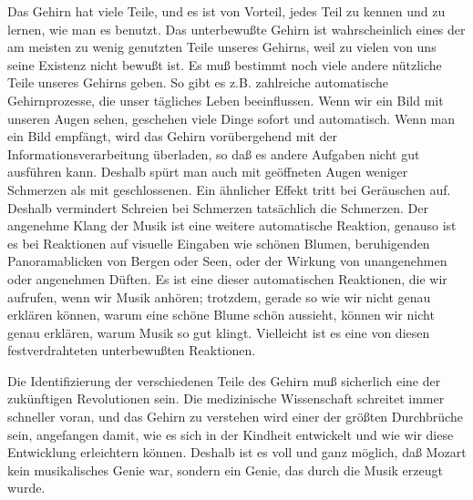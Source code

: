 Das Gehirn hat viele Teile, und es ist von Vorteil, jedes Teil zu kennen und zu lernen, wie man es benutzt.
Das unterbewußte Gehirn ist wahrscheinlich eines der am meisten zu wenig genutzten Teile unseres Gehirns, weil zu vielen von uns seine Existenz nicht bewußt ist.
Es muß bestimmt noch viele andere nützliche Teile unseres Gehirns geben.
So gibt es z.B. zahlreiche automatische Gehirnprozesse, die unser tägliches Leben beeinflussen.
Wenn wir ein Bild mit unseren Augen sehen, geschehen viele Dinge sofort und automatisch.
Wenn man ein Bild empfängt, wird das Gehirn vorübergehend mit der Informationsverarbeitung überladen, so daß es andere Aufgaben nicht gut ausführen kann.
Deshalb spürt man auch mit geöffneten Augen weniger Schmerzen als mit geschlossenen.
Ein ähnlicher Effekt tritt bei Geräuschen auf.
Deshalb vermindert Schreien bei Schmerzen tatsächlich die Schmerzen.
Der angenehme Klang der Musik ist eine weitere automatische Reaktion, genauso ist es bei Reaktionen auf visuelle Eingaben wie schönen Blumen, beruhigenden Panoramablicken von Bergen oder Seen, oder der Wirkung von unangenehmen oder angenehmen Düften.
Es ist eine dieser automatischen Reaktionen, die wir aufrufen, wenn wir Musik anhören;  trotzdem, gerade so wie wir nicht genau erklären können, warum eine schöne Blume schön aussieht, können wir nicht genau erklären, warum Musik so gut klingt.
Vielleicht ist es eine von diesen festverdrahteten unterbewußten Reaktionen.

Die Identifizierung der verschiedenen Teile des Gehirn muß sicherlich eine der zukünftigen Revolutionen sein.
Die medizinische Wissenschaft schreitet immer schneller voran, und das Gehirn zu verstehen wird einer der größten Durchbrüche sein, angefangen damit, wie es sich in der Kindheit entwickelt und wie wir diese Entwicklung erleichtern können.
Deshalb ist es voll und ganz möglich, daß Mozart kein musikalisches Genie war, sondern ein Genie, das durch die Musik erzeugt wurde.
 





